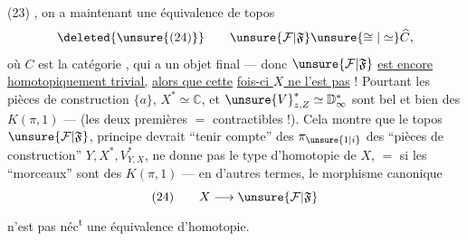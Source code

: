 \noindent (23)
,
on a maintenant une équivalence de topos
\[
\deleted{\unsure{(24)}}\qquad \unsure{\mathcal F|\mathfrak F}\unsure{\cong|\simeq}\widehat C,
\]
où $C$ est la catégorie \diagram{\begin{tikzcd}[column sep=small]\bullet\arrow[r]&\bullet\end{tikzcd}}, qui a
un objet final --- donc $\unsure{\mathcal F|\mathfrak F}$ \uline{est encore}
\uline{homotopiquement trivial,} \uline{alors que cette}
\uline{fois-ci $X$ ne l'est pas} ! Pourtant les
pièces de construction $\{a\}$, $X^*\simeq\mathbb C$, et
$\unsure{V}^*_{z,Z}\simeq\mathbb D^*_{\infty}$ sont bel et bien des $K(\pi,1)$ ---
(les deux premières $=$ contractibles !). Cela
montre que le topos $\unsure{\mathcal F|\mathfrak F}$, 
principe devrait ``tenir compte'' des
$\pi_{\unsure{1|i}}$ des ``pièces de construction'' $Y,X^*,V^*_{Y,X}$,
ne donne pas  le type d'homotopie
de $X$, $=$ si les ``morceaux'' sont des
$K(\pi,1)$ --- en d'autres termes, le
morphisme canonique
\[
(24)\qquad X\longrightarrow\unsure{\mathcal F|\mathfrak F}
\]
n'est pas néc\textsuperscript{t} une équivalence d'homotopie.
